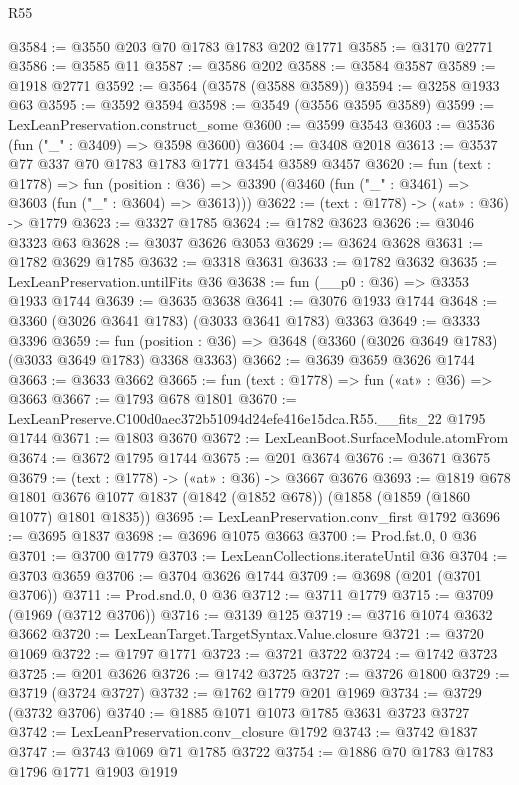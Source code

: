 \begin{lexlean}{R55}
\begin{coremodule}
@3584 := @3550 @203 @70 @1783 @1783 @202 @1771
@3585 := @3170 @2771
@3586 := @3585 @11
@3587 := @3586 @202
@3588 := @3584 @3587
@3589 := @1918 @2771
@3592 := @3564 (@3578 (@3588 @3589))
@3594 := @3258 @1933 @63
@3595 := @3592 @3594
@3598 := @3549 (@3556 @3595 @3589)
@3599 := LexLeanPreservation.construct_some
@3600 := @3599 @3543
@3603 := @3536 (fun ("_" : @3409) => @3598 @3600)
@3604 := @3408 @2018
@3613 := @3537 @77 @337 @70 @1783 @1783 @1771 @3454 @3589 @3457
@3620 := fun (text : @1778) =>
  fun (position : @36) => @3390 (@3460 (fun ("_" : @3461) => @3603 (fun ("_" : @3604) => @3613)))
@3622 := (text : @1778) -> («at» : @36) -> @1779
@3623 := @3327 @1785
@3624 := @1782 @3623
@3626 := @3046 @3323 @63
@3628 := @3037 @3626 @3053
@3629 := @3624 @3628
@3631 := @1782 @3629 @1785
@3632 := @3318 @3631
@3633 := @1782 @3632
@3635 := LexLeanPreservation.untilFits @36
@3638 := fun (__p0 : @36) => @3353 @1933 @1744
@3639 := @3635 @3638
@3641 := @3076 @1933 @1744
@3648 := @3360 (@3026 @3641 @1783) (@3033 @3641 @1783) @3363
@3649 := @3333 @3396
@3659 := fun (position : @36) => @3648 (@3360 (@3026 @3649 @1783) (@3033 @3649 @1783) @3368 @3363)
@3662 := @3639 @3659 @3626 @1744
@3663 := @3633 @3662
@3665 := fun (text : @1778) => fun («at» : @36) => @3663
@3667 := @1793 @678 @1801
@3670 := LexLeanPreserve.C100d0aec372b51094d24efe416e15dca.R55.__fits_22 @1795 @1744
@3671 := @1803 @3670
@3672 := LexLeanBoot.SurfaceModule.atomFrom
@3674 := @3672 @1795 @1744
@3675 := @201 @3674
@3676 := @3671 @3675
@3679 := (text : @1778) -> («at» : @36) -> @3667 @3676
@3693 := @1819
    @678
    @1801
    @3676
    @1077
    @1837
    (@1842 (@1852 @678))
    (@1858 (@1859 (@1860 @1077) @1801 @1835))
@3695 := LexLeanPreservation.conv_first @1792
@3696 := @3695 @1837
@3698 := @3696 @1075 @3663
@3700 := Prod.fst.{0, 0} @36
@3701 := @3700 @1779
@3703 := LexLeanCollections.iterateUntil @36
@3704 := @3703 @3659
@3706 := @3704 @3626 @1744
@3709 := @3698 (@201 (@3701 @3706))
@3711 := Prod.snd.{0, 0} @36
@3712 := @3711 @1779
@3715 := @3709 (@1969 (@3712 @3706))
@3716 := @3139 @125
@3719 := @3716 @1074 @3632 @3662
@3720 := LexLeanTarget.TargetSyntax.Value.closure
@3721 := @3720 @1069
@3722 := @1797 @1771
@3723 := @3721 @3722
@3724 := @1742 @3723
@3725 := @201 @3626
@3726 := @1742 @3725
@3727 := @3726 @1800
@3729 := @3719 (@3724 @3727)
@3732 := @1762 @1779 @201 @1969
@3734 := @3729 (@3732 @3706)
@3740 := @1885 @1071 @1073 @1785 @3631 @3723 @3727
@3742 := LexLeanPreservation.conv_closure @1792
@3743 := @3742 @1837
@3747 := @3743 @1069 @71 @1785 @3722
@3754 := @1886 @70 @1783 @1783 @1796 @1771 @1903 @1919

\end{coremodule}
\end{lexlean}
